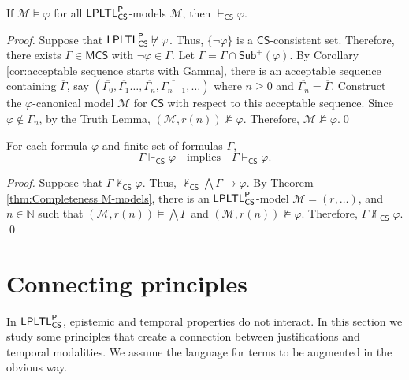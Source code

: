 \documentclass[envcountsect,envcountsame,oribibl,orivec]{llncs}
\newcommand{\LPLTLp}{\textsf{LPLTL}^{\sf P}}
\newcommand{\CS}{\textsf{CS}}
\newcommand{\entails}{\vDash}
\newcommand{\proves}{\vdash}
\newcommand{\M}{\mathcal{M}}
\newcommand{\N}{\mathbb{N}}
\renewcommand{\phi}{\varphi}
\newcommand{\Sub}{\mathsf{Sub}}
\newcommand{\MCS}{\mathsf{MCS}}
\begin{document}
\begin{theorem}[Completeness]\label{thm:Completeness M-models}
	\label{thm:completeness LPLTLp M-models}
	If	$\M\entails \phi$ for all $\LPLTLp_\CS$-models $\M$, then  $\proves_\CS \phi$.
\end{theorem}
\begin{proof}
	Suppose that $\LPLTLp_\CS \not\proves \phi$. Thus, $\{ \neg \phi\}$ is a $\CS$-consistent set.
	Therefore, there exists $\Gamma \in \MCS$ with $\neg \phi \in \Gamma$. Let $\overline{\Gamma} = \Gamma \cap \Sub^+(\phi)$.
	By Corollary \ref{cor:acceptable sequence starts with Gamma}, there is an acceptable sequence containing $\overline{\Gamma}$, say $(\overline{\Gamma_{0}},\overline{\Gamma_1}\ldots,\overline{\Gamma_n}, \overline{\Gamma_{n+1}}, \ldots)$ where $n \geq 0$ and  $\overline{\Gamma_n} = \overline{\Gamma}$. 
	Construct the $\phi$-canonical model $\M$ for $\CS$ with respect to this acceptable sequence.
	Since $\phi \not \in \Gamma_n$, by the Truth Lemma, $(\M, r(n)) \not\models \phi$. Therefore, $\M \not\models \phi$.\qed
\end{proof}

\begin{theorem}[Completeness]\label{thm:Weak Completeness M-models}
	For each formula $\phi$ and finite set of formulas $\Gamma$,
	\[
	\Gamma \Vdash_\CS  \phi  \quad\text{implies}\quad  \Gamma \vdash_\CS \phi.
	\]
\end{theorem}
\begin{proof}
	Suppose that $\Gamma \not\vdash_\CS \phi$. Thus, $\not \vdash_\CS \bigwedge \Gamma \to \phi$. By Theorem \ref{thm:Completeness M-models}, there is an $\LPLTLp_\CS$-model $\M = (r, \ldots)$,  and $n \in \N$ such that $(\M, r(n)) \models \bigwedge \Gamma$ and $(\M, r(n)) \not\models \phi$. Therefore, $\Gamma \not \Vdash_\CS \phi$. \qed
\end{proof}
\section{Connecting principles}
\label{sec:Connecting principles}

In $\LPLTLp_\CS$, epistemic and temporal properties do not interact. In this section we study some principles that create a connection between justifications and temporal modalities.
We assume the language for terms to be augmented in the obvious way.
\end{document}
